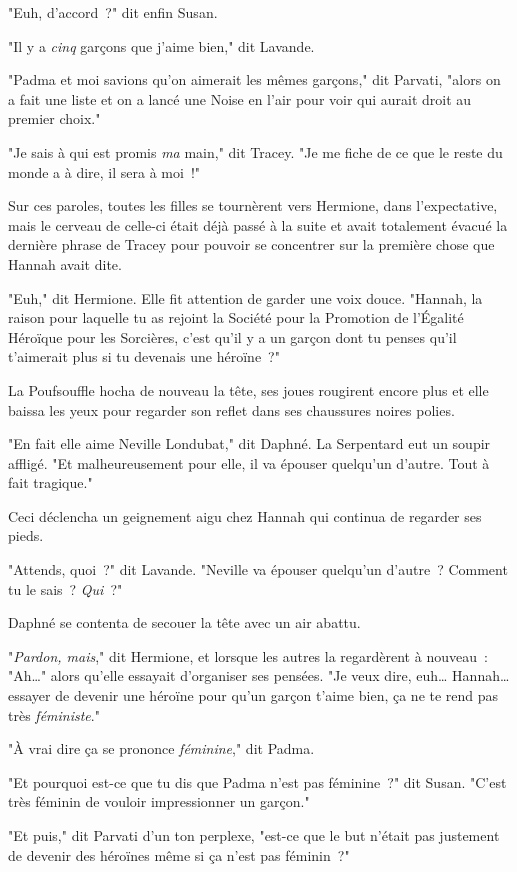"Euh, d'accord~?" dit enfin Susan.

"Il y a \emph{cinq} garçons que j'aime bien," dit Lavande.

"Padma et moi savions qu'on aimerait les mêmes garçons," dit Parvati, "alors on a fait une liste et on a lancé une Noise en l'air pour voir qui aurait droit au premier choix."

"Je sais à qui est promis \emph{ma} main," dit Tracey. "Je me fiche de ce que le reste du monde a à dire, il sera à moi~!"

Sur ces paroles, toutes les filles se tournèrent vers Hermione, dans l'expectative, mais le cerveau de celle-ci était déjà passé à la suite et avait totalement évacué la dernière phrase de Tracey pour pouvoir se concentrer sur la première chose que Hannah avait dite.

"Euh," dit Hermione. Elle fit attention de garder une voix douce. "Hannah, la raison pour laquelle tu as rejoint la Société pour la Promotion de l'Égalité Héroïque pour les Sorcières, c'est qu'il y a un garçon dont tu penses qu'il t'aimerait plus si tu devenais une héroïne~?"

La Poufsouffle hocha de nouveau la tête, ses joues rougirent encore plus et elle baissa les yeux pour regarder son reflet dans ses chaussures noires polies.

"En fait elle aime Neville Londubat," dit Daphné. La Serpentard eut un soupir affligé. "Et malheureusement pour elle, il va épouser quelqu'un d'autre. Tout à fait tragique."

Ceci déclencha un geignement aigu chez Hannah qui continua de regarder ses pieds.

"Attends, quoi~?" dit Lavande. "Neville va épouser quelqu'un d'autre~? Comment tu le sais~? \emph{Qui}~?"

Daphné se contenta de secouer la tête avec un air abattu.

"\emph{Pardon, mais}," dit Hermione, et lorsque les autres la regardèrent à nouveau~: "Ah…" alors qu'elle essayait d'organiser ses pensées. "Je veux dire, euh… Hannah… essayer de devenir une héroïne pour qu'un garçon t'aime bien, ça ne te rend pas très \emph{féministe}."

"À vrai dire ça se prononce \emph{féminine}," dit Padma.

"Et pourquoi est-ce que tu dis que Padma n'est pas féminine~?" dit Susan. "C'est très féminin de vouloir impressionner un garçon."

"Et puis," dit Parvati d'un ton perplexe, "est-ce que le but n'était pas justement de devenir des héroïnes même si ça n'est pas féminin~?"

